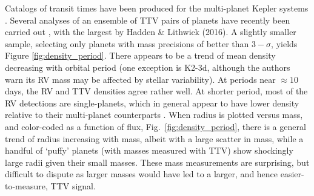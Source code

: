 \documentclass[graybox,natbib,nosecnum]{svmult}
\begin{document}
Catalogs of transit times have been produced for the multi-planet Kepler systems \citep{2013ApJS..208...16M,2016ApJS..225....9H}. Several analyses of an ensemble of TTV pairs of planets have recently been carried out \citep{2014ApJ...787...80H,2013ApJS..208...22X,2014ApJS..210...25X,2016ApJ...820...39J}, with the largest by Hadden \& Lithwick (2016).  A slightly smaller sample, selecting only planets with mass precisions of better than $3-\sigma$, yields Figure \ref{fig:density_period}.  There appears to be a trend of mean density decreasing with orbital period (one exception is K2-3d, although the authors warn its RV mass may be affected by stellar variability).  At periods near $\approx 10$ days, the RV and TTV densities agree rather well.  At shorter period, most of the RV detections are single-planets, which in general appear to have lower density relative to their multi-planet counterparts \citep{Steffen2016}.  When radius is plotted versus mass, and color-coded as a function of flux, Fig.\ \ref{fig:density_period}, there is a general trend of radius increasing with mass, albeit with a large scatter in mass, while a handful of `puffy' planets (with masses measured with TTV) show shockingly large radii given their small masses.  These mass measurements are surprising, but difficult to dispute as larger masses would have led to a larger, and hence easier-to-measure, TTV signal.
\end{document}

